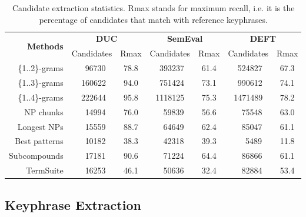     \begin{table}[h]
      \centering
      \begin{tabular}{rcccccc}
        \toprule
        \multirow{2}{*}[-2pt]{\textbf{Methods}} & \multicolumn{2}{c}{\textbf{DUC}} & \multicolumn{2}{c}{\textbf{SemEval}} & \multicolumn{2}{c}{\textbf{DEFT}}\\
        \cmidrule(r){2-3}\cmidrule(lr){4-5}\cmidrule(l){6-7}
        & Candidates & Rmax & Candidates & Rmax & Candidates & Rmax\\
        \midrule
        \{1..2\}-grams & $~~~~$96730 & 78.8 & $~~$393237 & 61.4 & $~~$524827 & 67.3\\
        \{1..3\}-grams & $~~$160622 & 94.0 & $~~$751424 & 73.1 & $~~$990612 & 74.1\\
        \{1..4\}-grams & $~~$222644 & 95.8 & 1118125 & 75.3 & 1471489 & 78.2\\
        NP chunks & $~~~~$14994 & 76.0 & $~~~~$59839 & 56.6 & $~~~~$75548 & 63.0 \\
        Longest NPs & $~~~~$15559 & 88.7 & $~~~~$64649 & 62.4 & $~~~~$85047 & 61.1\\
        Best patterns & $~~~~$10182 & 38.3 & $~~~~$42318 & 39.3 & $~~~~~~$5489 & 11.8 \\
        Subcompounds & $~~~~$17181 & 90.6 & $~~~~$71224 & 64.4 & $~~~~$86866 & 61.1 \\
        TermSuite & $~~~~$16253 & 46.1 & $~~~~$50636 & 32.4 & $~~~~$82884 & 53.4\\
        \bottomrule
      \end{tabular}
      \caption{Candidate extraction statistics. Rmax stands for maximum recall,
               i.e. it is the percentage of candidates that match with reference
               keyphrases. \label{tab:candidate_extraction_statistics}}
    \end{table}


  \subsection{Keyphrase Extraction}
  \label{subsec:keyphrase_extraction}


